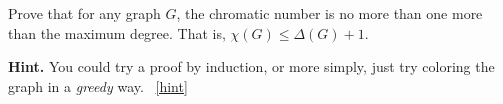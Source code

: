 \documentclass{book}
\begin{document}
\setcounter{project}{45}
\addtocounter{project}{-1}
\begin{activity}[]\label{activity-38}
\hypertarget{p-405}{}%
Prove that for any graph \(G\), the chromatic number is no more than one more than the maximum degree.  That is, \(\chi(G) \le \Delta(G) + 1\).%
\par\smallskip%
\noindent\textbf{Hint.}\hypertarget{hint-19}{}\quad%
\hypertarget{p-406}{}%
You could try a proof by induction, or more simply, just try coloring the graph in a \emph{greedy} way.%
~\hfill{\tiny\hyperlink{a-45}{[hint]}\hypertarget{q-45}{}}\end{activity}

\clearpage
\end{document}
